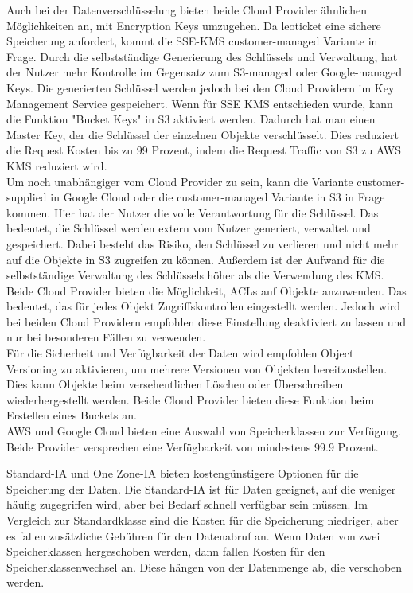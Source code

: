 Auch bei der Datenverschlüsselung bieten beide Cloud Provider ähnlichen Möglichkeiten an, mit Encryption Keys umzugehen. Da leoticket eine sichere Speicherung anfordert, kommt die SSE-KMS customer-managed Variante in Frage. Durch die selbstständige Generierung des Schlüssels und Verwaltung, hat der Nutzer mehr Kontrolle im Gegensatz zum S3-managed oder Google-managed Keys. Die generierten Schlüssel werden jedoch bei den Cloud Providern im Key Management Service gespeichert. Wenn für SSE KMS entschieden wurde, kann die Funktion "Bucket Keys" in S3 aktiviert werden. Dadurch hat man einen Master Key, der die Schlüssel der einzelnen Objekte verschlüsselt. Dies reduziert die Request Kosten bis zu 99 Prozent, indem die Request Traffic von S3 zu AWS KMS reduziert wird.\\

Um noch unabhängiger vom Cloud Provider zu sein, kann die Variante customer-supplied in Google Cloud oder die customer-managed Variante in S3 in Frage kommen. Hier hat der Nutzer die volle Verantwortung für die Schlüssel. Das bedeutet, die Schlüssel werden extern vom Nutzer generiert, verwaltet und gespeichert. Dabei besteht das Risiko, den Schlüssel zu verlieren und nicht mehr auf die Objekte in S3 zugreifen zu können. Außerdem ist der Aufwand für die selbstständige Verwaltung des Schlüssels höher als die Verwendung des KMS.\\

Beide Cloud Provider bieten die Möglichkeit, ACLs auf Objekte anzuwenden. Das bedeutet, das für jedes Objekt Zugriffskontrollen eingestellt werden. Jedoch wird bei beiden Cloud Providern empfohlen diese Einstellung deaktiviert zu lassen und nur bei besonderen Fällen zu verwenden.\\

Für die Sicherheit und Verfügbarkeit der Daten wird empfohlen Object Versioning zu aktivieren, um mehrere Versionen von Objekten bereitzustellen. Dies kann Objekte beim versehentlichen Löschen oder Überschreiben wiederhergestellt werden. Beide Cloud Provider bieten diese Funktion beim Erstellen eines Buckets an.\\

AWS und Google Cloud bieten eine Auswahl von Speicherklassen zur Verfügung. Beide Provider versprechen eine Verfügbarkeit von mindestens 99.9 Prozent. 

Standard-IA und One Zone-IA bieten kostengünstigere Optionen für die Speicherung der Daten. Die Standard-IA ist für Daten geeignet, auf die weniger häufig zugegriffen wird, aber bei Bedarf schnell verfügbar sein müssen. Im Vergleich zur Standardklasse sind die Kosten für die Speicherung niedriger, aber es fallen zusätzliche Gebühren für den Datenabruf an. Wenn Daten von zwei Speicherklassen hergeschoben werden, dann fallen Kosten für den Speicherklassenwechsel an. Diese hängen von der Datenmenge ab, die verschoben werden.\\

